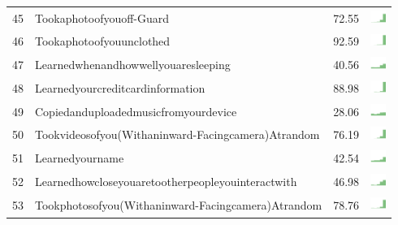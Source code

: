\begin{table}[t]
\begin{center}
\begin{tabular}{| p{0.5cm} | p{7cm} | p{1cm} | c |}
45 & Tookaphotoofyouoff-Guard & 72.55 & \includegraphics[width = 0.5cm, height = 0.5cm]{../tookaphotoofyouoff-guardcombined} \\ 
46 & Tookaphotoofyouunclothed & 92.59 & \includegraphics[width = 0.5cm, height = 0.5cm]{../tookaphotoofyouunclothedcombined} \\ 
47 & Learnedwhenandhowwellyouaresleeping & 40.56 & \includegraphics[width = 0.5cm, height = 0.5cm]{../learnedwhenandhowwellyouaresleepingcombined} \\ 
48 & Learnedyourcreditcardinformation & 88.98 & \includegraphics[width = 0.5cm, height = 0.5cm]{../learnedyourcreditcardinformationcombined} \\ 
49 & Copiedanduploadedmusicfromyourdevice & 28.06 & \includegraphics[width = 0.5cm, height = 0.5cm]{../copiedanduploadedmusicfromyourdevicecombined} \\ 
50 & Tookvideosofyou(Withaninward-Facingcamera)Atrandom & 76.19 & \includegraphics[width = 0.5cm, height = 0.5cm]{../tookvideosofyou(withaninward-facingcamera)atrandomcombined} \\ 
51 & Learnedyourname & 42.54 & \includegraphics[width = 0.5cm, height = 0.5cm]{../learnedyournamecombined} \\ 
52 & Learnedhowcloseyouaretootherpeopleyouinteractwith & 46.98 & \includegraphics[width = 0.5cm, height = 0.5cm]{../learnedhowcloseyouaretootherpeopleyouinteractwithcombined} \\ 
53 & Tookphotosofyou(Withaninward-Facingcamera)Atrandom & 78.76 & \includegraphics[width = 0.5cm, height = 0.5cm]{../tookphotosofyou(withaninward-facingcamera)atrandomcombined} \\ 

\end{tabular}
\end{center}
\end{table}
